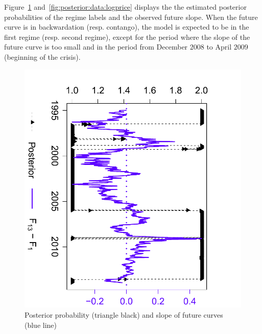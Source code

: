 Figure~\ref{fig:posterior:data} and~\ref{fig:posterior:data:logprice} displays the the estimated posterior probabilities of the regime labels and the observed future slope. When the future curve is in backwardation (resp. contango), the model is expected to be in the first regime (resp. second regime), except for the period where the slope of the future curve is too small and in the period from December $2008$ to April $2009$ (beginning of the crisis).






\begin{figure}
	\centering
	\includegraphics[scale=.6]{Posterior_Data}
	\caption{Posterior probability (triangle black) and slope of future curves (blue line)}
	\label{fig:posterior:data}
\end{figure}

